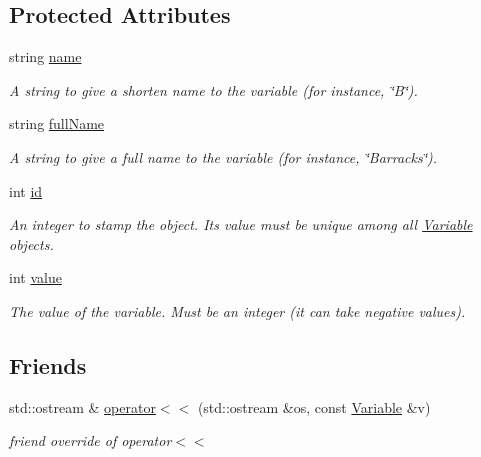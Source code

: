 \subsection*{Protected Attributes}
\begin{DoxyCompactItemize}
\item 
string \hyperlink{classghost_1_1Variable_a05cf4a4cd3a5c033028e0b0f11d1dafd}{name}
\begin{DoxyCompactList}\small\item\em A string to give a shorten name to the variable (for instance, \char`\"{}\-B\char`\"{}). \end{DoxyCompactList}\item 
string \hyperlink{classghost_1_1Variable_a87dc1fa73726f887a7ecbd5b9bfa7cab}{full\-Name}
\begin{DoxyCompactList}\small\item\em A string to give a full name to the variable (for instance, \char`\"{}\-Barracks\char`\"{}). \end{DoxyCompactList}\item 
int \hyperlink{classghost_1_1Variable_a3b1cd0e87cecbb58e115a9000be26f28}{id}
\begin{DoxyCompactList}\small\item\em An integer to stamp the object. Its value must be unique among all \hyperlink{classghost_1_1Variable}{Variable} objects. \end{DoxyCompactList}\item 
int \hyperlink{classghost_1_1Variable_a4623be8dd7ed2a0cb7033aec42033cb7}{value}
\begin{DoxyCompactList}\small\item\em The value of the variable. Must be an integer (it can take negative values). \end{DoxyCompactList}\end{DoxyCompactItemize}
\subsection*{Friends}
\begin{DoxyCompactItemize}
\item 
std\-::ostream \& \hyperlink{classghost_1_1Variable_aab05ab0693334e9e9a39f43903a37cb7}{operator$<$$<$} (std\-::ostream \&os, const \hyperlink{classghost_1_1Variable}{Variable} \&v)
\begin{DoxyCompactList}\small\item\em friend override of operator$<$$<$ \end{DoxyCompactList}\end{DoxyCompactItemize}


